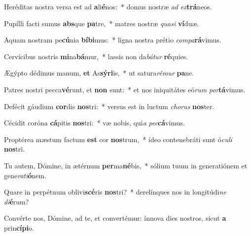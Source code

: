 \item Heréditas nostra versa est ad \textbf{a}li\textbf{é}nos:~* domus nostræ \textit{ad} \textit{ex}\textbf{trá}neos.
\item Pupílli facti sumus \textbf{abs}que \textbf{pa}tre,~* matres nostræ \textit{qua}\textit{si} \textbf{ví}duæ.
\item Aquam nostram pe\textbf{cú}nia \textbf{bí}\textbf{bi}mus:~* ligna nostra prétio \textit{com}\textit{pa}\textbf{rá}vimus.
\item Cervícibus nostris \textbf{mi}na\textbf{bá}mur,~* lassis non da\textit{bá}\textit{tur} \textbf{ré}quies.
\item Ægýpto dédimus manum, \textbf{et} As\textbf{sý}\textbf{ri}is,~* ut satura\textit{ré}\textit{mur} \textbf{pa}ne.
\item Patres nostri pecca\textbf{vé}runt, et \textbf{non} sunt:~* et nos iniquitátes eó\textit{rum} \textit{por}\textbf{tá}vimus.
\item Defécit gáudium \textbf{cor}dis \textbf{nos}tri:~* versus est in luctum \textit{cho}\textit{rus} \textbf{nos}ter.
\item Cécidit coróna \textbf{cá}pitis \textbf{nos}tri:~* væ nobis, qui\textit{a} \textit{pec}\textbf{cá}vimus.
\item Proptérea mæstum factum \textbf{est} cor \textbf{nos}trum,~* ídeo contenebráti sunt ó\textit{cu}\textit{li} \textbf{nos}tri.
\item Tu autem, Dómine, in ætérnum \textbf{per}ma\textbf{né}bis,~* sólium tuum in generatiónem et gene\textit{ra}\textit{ti}\textbf{ó}nem.
\item Quare in perpétuum oblivi\textbf{scé}ris \textbf{nos}tri?~* derelínques nos in longitúdi\textit{ne} \textit{di}\textbf{é}rum?
\item Convérte nos, Dómine, ad te, et convertémur: ínnova dies nostros, sicut \textbf{a} prin\textbf{cí}\textbf{pi}o.
